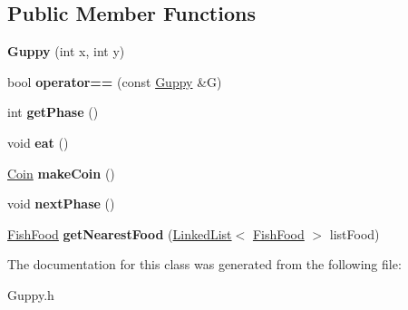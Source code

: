 \subsection*{Public Member Functions}
\begin{DoxyCompactItemize}
\item 
\mbox{\label{class_guppy_a8b7a9abdd40f669b4e84b66d0cf403ef}} 
{\bfseries Guppy} (int x, int y)
\item 
\mbox{\label{class_guppy_a02efb73289d3b94264fba7d6c1d985b8}} 
bool {\bfseries operator==} (const \mbox{\hyperlink{class_guppy}{Guppy}} \&G)
\item 
\mbox{\label{class_guppy_a77d65bb4c13bbd85d4acd65f11a21b9e}} 
int {\bfseries get\+Phase} ()
\item 
\mbox{\label{class_guppy_afe934262a0988e4ad041f4ed3a1a7e02}} 
void {\bfseries eat} ()
\item 
\mbox{\label{class_guppy_abb939e91eb5b9b1609cc0b78ec1bd4b2}} 
\mbox{\hyperlink{class_coin}{Coin}} {\bfseries make\+Coin} ()
\item 
\mbox{\label{class_guppy_af05a02b3c902ab272e775d6b4dd33ef3}} 
void {\bfseries next\+Phase} ()
\item 
\mbox{\label{class_guppy_ae26531e81083050c4fab3b3358b49cc5}} 
\mbox{\hyperlink{class_fish_food}{Fish\+Food}} {\bfseries get\+Nearest\+Food} (\mbox{\hyperlink{class_linked_list}{Linked\+List}}$<$ \mbox{\hyperlink{class_fish_food}{Fish\+Food}} $>$ list\+Food)
\end{DoxyCompactItemize}


The documentation for this class was generated from the following file\+:\begin{DoxyCompactItemize}
\item 
Guppy.\+h\end{DoxyCompactItemize}
